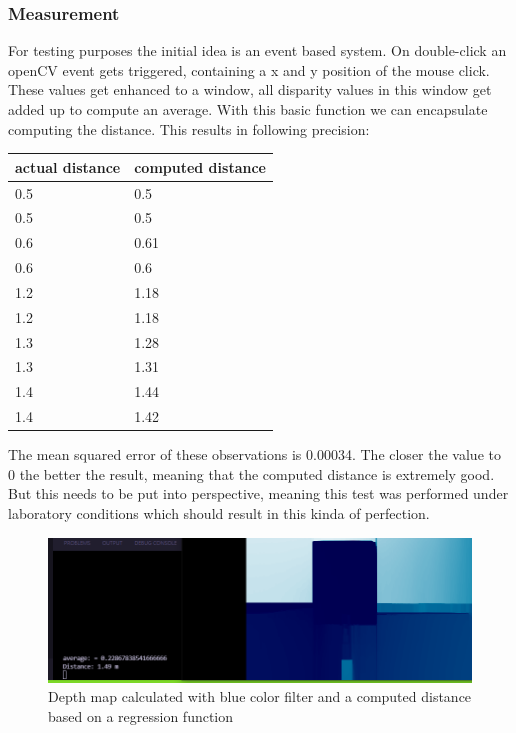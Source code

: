\documentclass[journal,onecolumn]{IEEEtran}
\begin{document}
\subsubsection{Measurement}
For testing purposes the initial idea is an event based system. On double-click an openCV event gets triggered, containing a x and y position of the mouse click. These values get enhanced to a window, all disparity values in this window get added up to compute an average. With this basic function we can encapsulate computing the distance. This results in following precision:
\begin{table}[H]
	\begin{tabular}{|l|l|}
		\hline
		actual distance & computed distance \\ \hline
		0.5             & 0.5               \\ \hline
		0.5             & 0.5               \\ \hline
		0.6             & 0.61              \\ \hline
		0.6             & 0.6               \\ \hline
		1.2             & 1.18              \\ \hline
		1.2             & 1.18              \\ \hline
		1.3             & 1.28              \\ \hline
		1.3             & 1.31              \\ \hline
		1.4             & 1.44              \\ \hline
		1.4             & 1.42              \\ \hline
	\end{tabular}
\end{table}
\noindent The mean squared error of these observations is 0.00034. The closer the value to 0 the better the result, meaning that the computed distance is extremely good. But this needs to be put into perspective, meaning this test was performed under laboratory conditions which should result in this kinda of perfection.
\begin{figure}[H]
	\centering
	\includegraphics[scale=0.5]{distanceCalcRegression.png}
	\captionsetup{justification=centering}
	\caption{Depth map calculated with blue color filter and a computed distance based on a regression function}
\end{figure}
\end{document}

